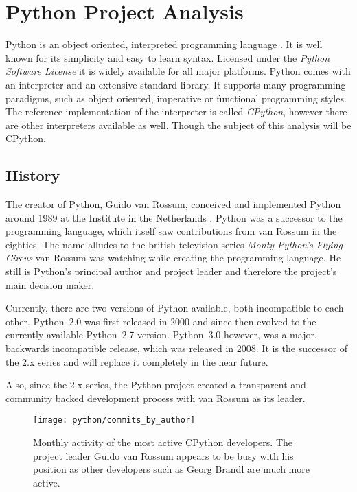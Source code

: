 \section{Python Project Analysis} %


Python is an object oriented, interpreted programming language
\cite{PythonAbout}. It is well known for its simplicity and easy to learn
syntax. Licensed under the \emph{Python Software License} \cite{PythonLicence}
it is widely available for all major platforms. Python comes with an
interpreter and an extensive standard library. It supports many programming
paradigms, such as object oriented, imperative or functional programming
styles. The reference implementation of the interpreter is called
\emph{CPython}, however there are other interpreters available as well. Though
the subject of this analysis will be CPython.

\subsection{History} %

The creator of Python, Guido van Rossum, conceived and implemented Python
around 1989 at the  Institute in the Netherlands \cite{Venners2003}. Python
was a successor to the  programming language, which itself saw contributions
from van Rossum in the eighties. The name alludes to the british television
series \emph{Monty Python's Flying Circus} van Rossum was watching while
creating the programming language. He still is Python's principal author and
project leader and therefore the project's main decision maker.

Currently, there are two versions of Python available, both incompatible to
each other. Python~2.0 was first released in 2000 and since then evolved to the
currently available Python~2.7 version. Python~3.0 however, was a major,
backwards incompatible release, which was released in 2008. It is the successor
of the 2.x series and will replace it completely in the near future.

Also, since the 2.x series, the Python project created a transparent and
community backed development process with van Rossum as its leader.

\begin{figure}[htbp]
  \centering
  \texttt{[image: python/commits\_by\_author]}
  \caption[Commits by Most Active Authors, Python]
  {Monthly activity of the most active CPython developers. The project
    leader Guido van Rossum appears to be busy with his position as other
    developers such as Georg Brandl are much more active.}
\end{figure}

